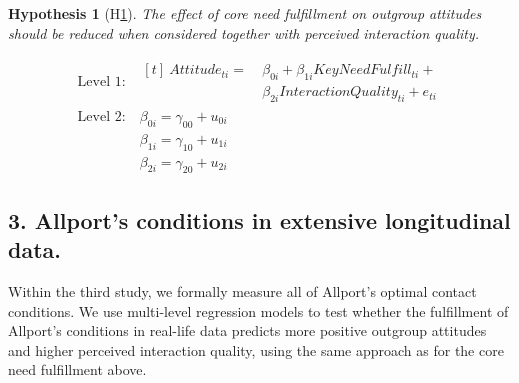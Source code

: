 \documentclass[man, 12pt, a4paper, mask]{apa7}
\theoremstyle{break}
\theoremstyle{plain}
\newtheorem{subhyp}{Hypothesis}
\begin{document}
\begin{mdframed}[style=mdfhypothesis]
    \begin{subhyp}[H\ref{hyp:keyNeedMediation}] \label{hyp:keyNeedMediation}
    \addtolength{\leftskip}{\subhypskip}
    The effect of core need fulfillment on outgroup attitudes should be reduced when considered together with perceived interaction quality.
    \end{subhyp}

    \begin{fleqn}[\eqskip]
      \begin{equation} \label{eq:SlopesAttCoreQual}
        \begin{split}
          \textrm{Level 1:} &
            \begin{aligned}[t]
              \ Attitude_{ti} =  &\ \beta_{0i} + \beta_{1i}KeyNeedFulfill_{ti} + \\
                                 &\ \beta_{2i}InteractionQuality_{ti} + e_{ti}
            \end{aligned} \\
          \textrm{Level 2:} &\ \beta_{0i} = \gamma_{00} + u_{0i} \\
                            &\ \beta_{1i} = \gamma_{10} + u_{1i} \\
                            &\ \beta_{2i} = \gamma_{20} + u_{2i}
        \end{split} 
      \end{equation}
    \end{fleqn}
\end{mdframed}

\subsection{3. Allport's conditions in extensive longitudinal data.}
Within the third study, we formally measure all of Allport's optimal contact conditions. We use multi-level regression models to test whether the fulfillment of Allport's conditions in real-life data predicts more positive outgroup attitudes and higher perceived interaction quality, using the same approach as for the core need fulfillment above.
\end{document}
